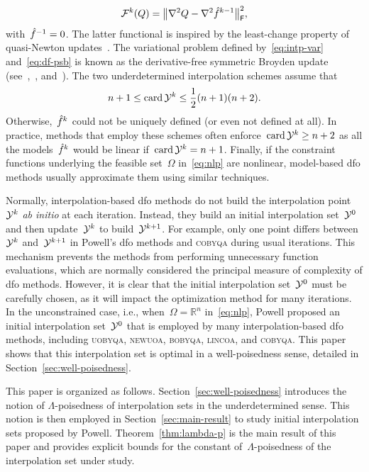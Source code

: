 \documentclass{article}
\numberwithin{equation}{section}
\theoremstyle{definition}
\theoremstyle{plain}
\theoremstyle{remark}
\DeclareMathOperator{\card}{card}
\newcommand*{\fset}{\Omega}
\newcommand*{\norm}[2][]{#1\lVert#2#1\rVert}
\newcommand*{\obj}{f}
\newcommand*{\objm}[1][]{\hat{\obj}\ifblank{#1}{}{^{#1}}}
\newcommand*{\R}{\mathbb{R}}
\newcommand*{\solvername}[1]{\textsc{#1}\xspace}
\newcommand*{\xpt}[1][]{\mathcal{Y}\ifblank{#1}{}{^{#1}}}
\begin{document}
\begin{equation}
    \label{eq:df-psb}
    \mathcal{F}^k(Q) = \norm[\big]{\nabla^2 Q - \nabla^2 \objm[k - 1]}_{\mathsf{F}}^2,
\end{equation}
with~$\objm[-1] = 0$.
The latter functional is inspired by the least-change property of quasi-Newton updates~\cite{Dennis_Schnabel_1979}.
The variational problem defined by~\eqref{eq:intp-var} and~\eqref{eq:df-psb} is known as the derivative-free symmetric Broyden update (see~\cite{Powell_2013},~\cite[\S~3.6]{Zhang_2012}, and~\cite[\S~2.4.2]{Ragonneau_2022}).
The two underdetermined interpolation schemes assume that
\begin{equation*}
    n + 1 \le \card\xpt[k] \le \frac{1}{2} (n + 1) (n + 2).
\end{equation*}
Otherwise,~$\objm[k]$ could not be uniquely defined (or even not defined at all).
In practice, methods that employ these schemes often enforce~$\card\xpt[k] \ge n + 2$ as all the models~$\objm[k]$ would be linear if~$\card\xpt[k] = n + 1$.
Finally, if the constraint functions underlying the feasible set~$\fset$ in~\eqref{eq:nlp} are nonlinear, model-based \gls{dfo} methods usually approximate them using similar techniques.

Normally, interpolation-based \gls{dfo} methods do not build the interpolation point~$\xpt[k]$ \emph{ab initio} at each iteration.
Instead, they build an initial interpolation set~$\xpt[0]$ and then  update~$\xpt[k]$ to build~$\xpt[k + 1]$.
For example, only one point differs between~$\xpt[k]$ and~$\xpt[k + 1]$ in Powell's \gls{dfo} methods and \solvername{cobyqa} during usual iterations.
This mechanism prevents the methods from performing unnecessary function evaluations, which are normally considered the principal measure of complexity of \gls{dfo} methods.
However, it is clear that the initial interpolation set~$\xpt[0]$ must be carefully chosen, as it will impact the optimization method for many iterations.
In the unconstrained case, i.e., when~$\fset = \R^n$ in~\eqref{eq:nlp}, Powell proposed an initial interpolation set~$\xpt[0]$ that is employed by many interpolation-based \gls{dfo} methods, including \solvername{uobyqa}, \solvername{newuoa}, \solvername{bobyqa}, \solvername{lincoa}, and \solvername{cobyqa}.
This paper shows that this interpolation set is optimal in a well-poisedness sense, detailed in Section~\ref{sec:well-poisedness}.

This paper is organized as follows.
Section~\ref{sec:well-poisedness} introduces the notion of $\Lambda$-poisedness of interpolation sets in the underdetermined sense.
This notion is then employed in Section~\ref{sec:main-result} to study initial interpolation sets proposed by Powell.
Theorem~\ref{thm:lambda-p} is the main result of this paper and provides explicit bounds for the constant of~$\Lambda$-poisedness of the interpolation set under study.
\end{document}
